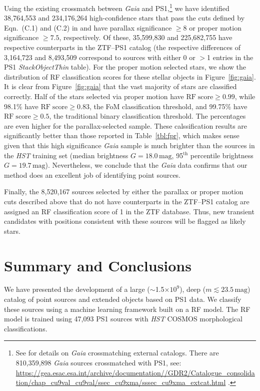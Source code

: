 \documentclass[twocolumn, dvipdfmx]{aastex62}
\begin{document}
\begin{CJK*}{UTF8}{gbsn}
Using the existing crossmatch between \textit{Gaia} and PS1,\footnote{See
\citet{Marrese17} for details on \textit{Gaia} crossmatching external
catalogs. There are 810,359,898 \textit{Gaia} sources crossmatched with PS1,
see:
%
\url{https://gea.esac.esa.int/archive/documentation//GDR2/Catalogue_consolidation/chap_cu9val_cu9val/ssec_cu9xma/sssec_cu9xma_extcat.html}
%
.} we have identified 38,764,553 and 234,176,264 high-confidence stars that
pass the cuts defined by Eqn.~(C.1) and (C.2) in \citet{Lindegren18} and
have parallax significance $\ge 8$ or proper motion significance $\ge 7.5$,
respectively. Of these, 35,599,830 and 225,682,755 have respective
counterparts in the ZTF--PS1 catalog (the respective differences of
3,164,723 and 8,493,509 correspond to sources with either 0 or $>$1 entries
in the PS1 \textit{StackObjectThin} table). For the proper motion selected
stars, we show the distribution of RF classification scores for these
stellar objects in Figure~\ref{fig:gaia}. It is clear from
Figure~\ref{fig:gaia} that the vast majority of stars are classified
correctly. Half of the stars selected via proper motion have
$\mathrm{RF\;score}\ge 0.99$, while 98.1\% have $\mathrm{RF\;score}\ge
0.83$, the FoM classification threshold, and 99.75\% have
$\mathrm{RF\;score}\ge 0.5$, the traditional binary classification
threshold. The percentages are even higher for the parallax-selected sample.
These calssification results are significantly better than those reported in
Table~\ref{tbl:fpr}, which makes sense given that this high significance
\textit{Gaia} sample is much brighter than the sources in the \textit{HST}
training set (median brightness $G = 18.0\,\mathrm{mag}$, 95$^\mathrm{th}$
percentile brightness $G = 19.7\,\mathrm{mag}$). Nevertheless, we conclude
that the \textit{Gaia} data confirms that our method does an excellent job
of identifying point sources.

Finally, the 8,520,167 sources selected by either the parallax or proper
motion cuts described above that do not have counterparts in the ZTF--PS1
catalog are assigned an RF classification score of 1 in the ZTF database.
Thus, new transient candidates with positions consistent with these sources
will be flagged as likely stars.

\section{Summary and Conclusions}

We have presented the development of a large ($\sim$1.5$\times 10^{9}$),
deep ($m \lesssim 23.5\,\mathrm{mag}$) catalog of point sources and extended
objects based on PS1 data. We classify these sources using a machine
learning framework built on a RF model. The RF model is trained using 47,093
PS1 sources with \textit{HST} COSMOS morphological classifications.


\end{CJK*}
\end{document}
